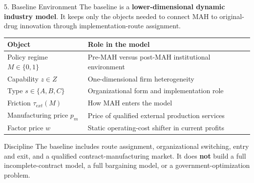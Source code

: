 \documentclass[aspectratio=169,11pt]{beamer}
\begin{document}
\begin{frame}{5. Baseline Environment}
\small
The baseline is a \textbf{lower-dimensional dynamic industry model}. It keeps only the objects
needed to connect MAH to original-drug innovation through implementation-route assignment.

\vspace{0.15cm}
\begin{center}
\begin{tabular}{p{}p{}}
\toprule
\textbf{Object} & \textbf{Role in the model} \\
\midrule
Policy regime \(M\in\{0,1\}\) & Pre-MAH versus post-MAH institutional environment \\
Capability \(z\in Z\) & One-dimensional firm heterogeneity \\
Type \(s\in\{A,B,C\}\) & Organizational form and implementation role \\
Friction \(\tau_{ext}(M)\) & How MAH enters the model \\
Manufacturing price \(p_m\) & Price of qualified external production services \\
Factor price \(w\) & Static operating-cost shifter in current profits \\
\bottomrule
\end{tabular}
\end{center}

\begin{block}{Discipline}
The baseline includes route assignment, organizational switching, entry and exit, and a qualified contract-manufacturing market. It does \textbf{not} build a full incomplete-contract model, a full bargaining model, or a government-optimization problem.
\end{block}
\end{frame}
\end{document}
